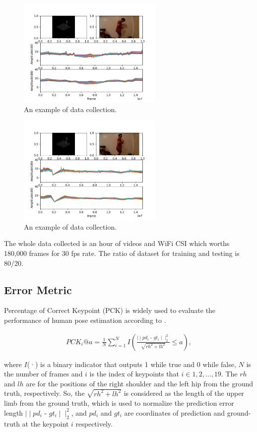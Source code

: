 \documentclass[10pt,letterpaper]{article}
\begin{document}
	
\begin{figure}[htbp]
	\centerline{\includegraphics[width=70mm,scale=0.2]{VIS02.png}}
	\caption{An example of data collection.}
	\label{fig:VIS02}
\end{figure}
\begin{figure}[htbp]
	\centerline{\includegraphics[width=70mm,scale=0.2]{VIS03.png}}
	\caption{An example of data collection.}
	\label{fig:VIS03}
\end{figure}


	The whole data collected is an hour of videos and WiFi CSI which worths 180,000 frames for 30 fps rate. The ratio of dataset for training and testing is 80/20.
	
	
	\subsection*{Error Metric}
	
	
	Percentage of Correct Keypoint (PCK) is widely used to evaluate the performance of human pose estimation according to \cite{wangF}.
	
	\begin{equation}
	\begin{aligned}
	PCK_i@a = \frac{1}{N} \sum_{i=1}^{N}
	I(
	\frac{\mid \mid  pd_i \text{ - } gt_i \mid \mid^2_2}{\sqrt{rh^2+lh^2}}  \le a ),
	\label{eq:PCK}
	\end{aligned}
	\end{equation}
	
	
	where $I$(·) is a binary indicator that outputs 1 while true and 0 while false, 
	$N$ is the number of frames and $i$ is the index of keypoints that $i \in {1, 2, ..., 19}$. The $rh$ and
	$lh$ are for the positions of the right shoulder and the left hip from the ground truth, respectively.
	So, the ${\sqrt{rh^2+lh^2}}$ is  considered as the length of the upper limb from the ground truth, which is used to normalize the prediction error length
	$ \mid \mid pd_i \text{ - } gt_i \mid \mid _2^2$, and $pd_i$ and $gt_i$ are coordinates of prediction and ground-truth at the keypoint $i$ respectively.
	
\end{document}
